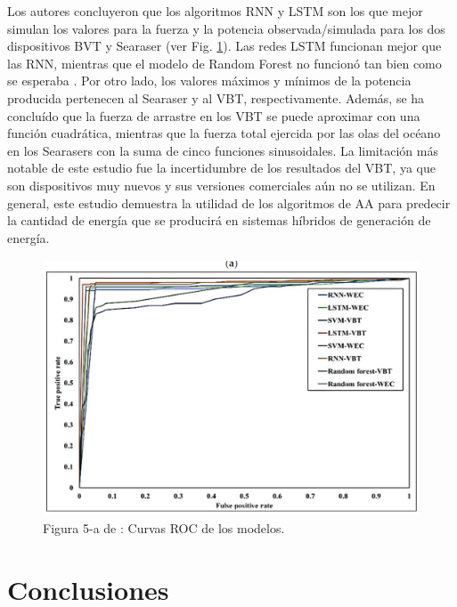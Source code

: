 \documentclass[12pt]{article}
\begin{document}
Los autores concluyeron que los algoritmos RNN y LSTM son los que mejor simulan los valores para la fuerza y la potencia observada/simulada para los dos dispositivos BVT y Searaser (ver Fig. \ref{Mahsa_res3}). Las redes LSTM funcionan mejor que las RNN, mientras que el modelo de Random Forest no funcionó tan bien como se esperaba . 
Por otro lado, los valores máximos y mínimos de la potencia producida pertenecen al Searaser y al VBT, respectivamente. Además, se ha concluído que la fuerza de arrastre en los VBT se puede aproximar con una función cuadrática, mientras que la fuerza total ejercida por las olas del océano en los Searasers con la suma de cinco funciones sinusoidales. 
La limitación más notable de este estudio fue la incertidumbre de los resultados del VBT, ya que son dispositivos muy nuevos y sus versiones comerciales aún no se utilizan. En general, este estudio demuestra la utilidad de los algoritmos de AA para predecir la cantidad de energía que se producirá en sistemas híbridos de generación de energía.


\begin{figure}[h!]
\centering
\includegraphics[height=3in]{figures/Mahsa_res3.PNG}
\caption{Figura 5-a de \cite{Mahsa}: Curvas ROC de los modelos.}
\label{Mahsa_res3}
\end{figure}



\section{Conclusiones}
\end{document}
